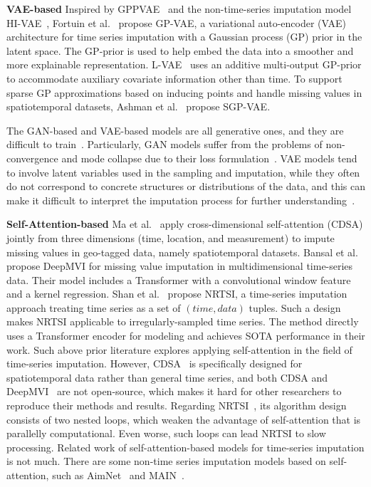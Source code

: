 \documentclass{article}
\begin{document}
\textbf{VAE-based} \hspace{1em}
Inspired by GPPVAE~\cite{Casale2018GPPVAE} and the non-time-series imputation model HI-VAE~\cite{Nazabal2020HIVAE}, Fortuin et al.~\cite{Fortuin2020GPVAE} propose GP-VAE, a variational auto-encoder (VAE) architecture for time series imputation with a Gaussian process (GP) prior in the latent space. The GP-prior is used to help embed the data into a smoother and more explainable representation. L-VAE~\cite{Ramchandran2021LVAE} uses an additive multi-output GP-prior to accommodate auxiliary covariate information other than time. To support sparse GP approximations based on inducing points and handle missing values in spatiotemporal datasets, Ashman et al.~\cite{Ashman2020SGPVAE} propose SGP-VAE.

The GAN-based and VAE-based models are all generative ones, and they are difficult to train~\cite{Wu2020AimNet}. Particularly, GAN models suffer from the problems of non-convergence and mode collapse due to their loss formulation~\cite{Salimans2016GAN}. VAE models tend to involve latent variables used in the sampling and imputation, while they often do not correspond to concrete structures or distributions of the data, and this can make it difficult to interpret the imputation process for further understanding~\cite{Wu2020AimNet}.

\textbf{Self-Attention-based} \hspace{1em}
Ma et al.~\cite{Ma2019CDSA} apply cross-dimensional self-attention (CDSA) jointly from three dimensions (time, location, and measurement) to impute missing values in geo-tagged data, namely spatiotemporal datasets. Bansal et al.~\cite{Bansal2021DeepMVI} propose DeepMVI for missing value imputation in multidimensional time-series data. Their model includes a Transformer with a convolutional window feature and a kernel regression. Shan et al.~\cite{Shan2021NRTSI} propose NRTSI, a time-series imputation approach treating time series as a set of $(time, data)$ tuples. Such a design makes NRTSI applicable to irregularly-sampled time series. The method directly uses a Transformer encoder for modeling and achieves SOTA performance in their work. Such above prior literature explores applying self-attention in the field of time-series imputation. However, CDSA~\cite{Ma2019CDSA} is specifically designed for spatiotemporal data rather than general time series, and both CDSA and DeepMVI~\cite{Bansal2021DeepMVI} are not open-source, which makes it hard for other researchers to reproduce their methods and results. Regarding NRTSI~\cite{Shan2021NRTSI}, its algorithm design consists of two nested loops, which weaken the advantage of self-attention that is parallelly computational. Even worse, such loops can lead NRTSI to slow processing. Related work of self-attention-based models for time-series imputation is not much. There are some non-time series imputation models based on self-attention, such as AimNet~\cite{Wu2020AimNet} and MAIN~\cite{Mouselinos2021MAIN}.
\end{document}
